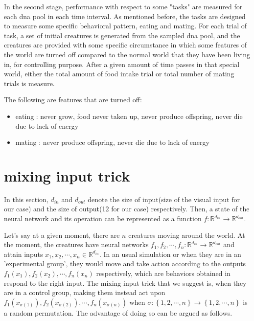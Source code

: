 \documentclass{amsart}
\theoremstyle{definition}
\theoremstyle{remark}
\numberwithin{equation}{section}
\newcommand{\set}[1]{\left\{#1\right\}}
\begin{document}
In the second stage, performance with respect to some "tasks" are measured for each dna pool in each time interval. As mentioned before, the tasks are designed to measure some specific behavioral pattern, eating and mating. For each trial of task, a set of initial creatures is generated from the sampled dna pool, and the creatures are provided with some specific circumstance in which some features of the world are turned off compared to the normal world that they have been living in, for controlling purpose. After a given amount of time passes in that special world, either the total amount of food intake trial or total number of mating trials is measure.

The following are features that are turned off:

\begin{itemize}
\item 
eating : never grow, food never taken up, never produce offspring, never die due to lack of energy 

\item
mating : never produce offspring, never die due to lack of energy 
\end{itemize}

\section{mixing input trick}
In this section, $d_{in}$ and $d_{out}$ denote the size of input(size of the visual input for our case) and the size of output(12 for our case) respectively. Then, a state of the neural network and its operation can be represented as a function $f:\mathbb{R}^{d_{in}}\to\mathbb{R}^{d_{out}}$.  

Let's say at a given moment, there are $n$ creatures moving around the world. At the moment, the creatures have neural networks $f_1,f_2,\cdots,f_n:\mathbb{R}^{d_{in}}\to\mathbb{R}^{d_{out}}$ and attain inputs $x_1,x_2,\cdots,x_n\in\mathbb{R}^{d_{in}}$. In an usual simulation or when they are in an 'experimental group', they would move and take action according to the outputs $f_1(x_1),f_2(x_2),\cdots,f_n(x_n)$ respectively, which are behaviors obtained in respond to the right input. The mixing input trick that we suggest is, when they are in a control group, making them instead act upon $f_1(x_{\sigma(1)}),f_2(x_{\sigma(2)}),\cdots, f_n(x_{\sigma(n)})$ when $\sigma:\set{1,2,\cdots,n}\to\set{1,2,\cdots,n}$ is a random permutation. The advantage of doing so can be argued as follows. 
\end{document}
